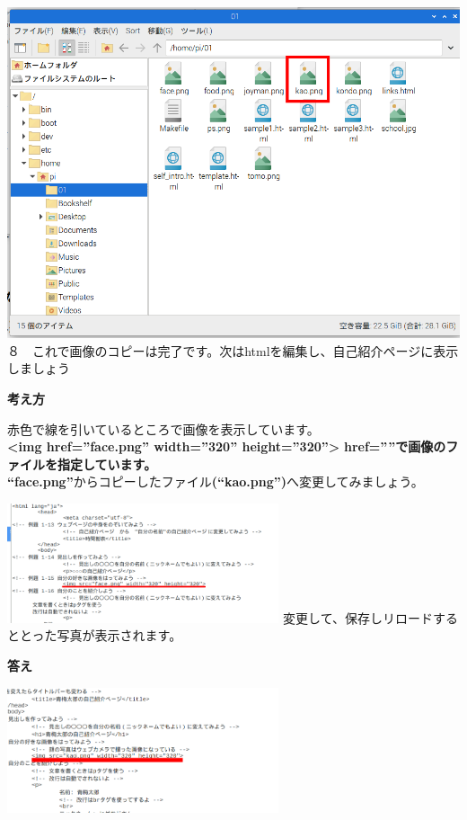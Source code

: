 \documentclass[a4paper,12pt]{jarticle}
\begin{document}
\hfill
\vspace{20pt}
\begin{minipage}{0.45\linewidth}
  \includegraphics[width=\linewidth]{textbook-img170.png}\\
  ８　これで画像のコピーは完了です。次はhtmlを編集し、自己紹介ページに表示しましょう
\end{minipage}

\clearpage
\flushleft
\textbf{考え方}\ \


赤色で線を引いているところで画像を表示しています。\\
\textbf{{\textless}img href=”face.png” width=”320” height=”320”{\textgreater}}
\textbf{href=””で画像のファイルを指定しています。}\\
\textbf{“face.png”}からコピーしたファイル\textbf{(“kao.png”)}へ変更してみましょう。

\begin{minipage}{\textwidth}
  \includegraphics[width=0.6\textwidth]{textbook-img171.png}
  \newline
  変更して、保存しリロードするととった写真が表示されます。
\end{minipage}

\flushleft
\textbf{答え}

\includegraphics[width=0.6\textwidth]{textbook-img172.png}
\end{document}

